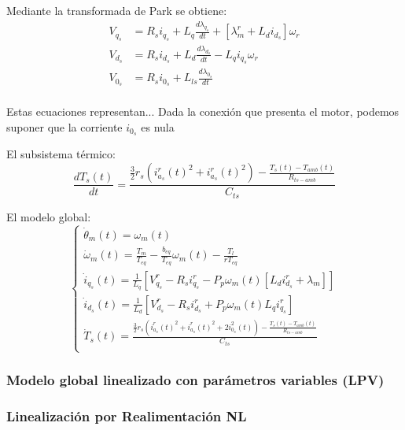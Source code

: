 \documentclass{article}
\begin{document}
Mediante la transformada de Park se obtiene:
\begin{equation}
    \begin{aligned}
        V_{q_{s}} &= R_{s}i_{q_{s}} + L_{q}\frac{d\lambda_{q_{s}}}{dt} + [\lambda_{m}^r + L_{d}i_{d_{s}}]\omega_{r}\\
        V_{d_{s}} &= R_{s}i_{d_{s}} + L_{d}\frac{d\lambda_{d_{s}}}{dt} - L_{q}i_{q_{s}}\omega_{r}\\
        V_{0_{s}} &= R_{s}i_{0_{s}} + L_{ls}\frac{d\lambda_{0_{s}}}{dt}\\
    \end{aligned}
\end{equation}

Estas ecuaciones representan...
Dada la conexión que presenta el motor, podemos suponer que la corriente $i_{0_{s}}$ es nula

El subsistema térmico:
\begin{equation}
    \frac{dT_{s}(t)}{dt} = \frac{\frac{3}{2}r_{s}({i_{a_{s}}^r(t)}^2+{i_{a_{s}}^r(t)}^2)-\frac{T_{s}(t)-T_{amb}(t)}{R_{ts-amb}}}{C_{ts}}
\end{equation}

El modelo global:
\begin{equation}
    \begin{cases}
        \dot{\theta}_{m}(t) = \omega_{m}(t)\\
        \dot{\omega}_{m}(t) = \frac{T_{m}}{T_{eq}} - \frac{b_{eq}}{T_{eq}}\omega_{m}(t) - \frac{T_{l}}{rT_{eq}}\\
        \dot{i}_{q_{s}}(t) = \frac{1}{L_{q}}[V_{q_{s}}^r - R_{s}i_{q_{s}}^r - P_{p}\omega_{m}(t)[L_{d}i_{d_{s}}^r+\lambda_{m}]]  \\
        \dot{i}_{d_{s}}(t) = \frac{1}{L_{d}}[V_{d_{s}}^r - R_{s}i_{d_{s}}^r + P_{p}\omega_{m}(t)L_{q}i_{q_{s}}^r]  \\
        \dot{T}_{s}(t) = \frac{\frac{3}{2}r_{s}({i_{a_{s}}^r(t)}^2+{i_{a_{s}}^r(t)}^2+2i_{0_{s}}^2(t))-\frac{T_{s}(t)-T_{amb}(t)}{R_{ts-amb}}}{C_{ts}}\\
    \end{cases}
\end{equation}

\subsubsection*{Modelo global linealizado con parámetros variables (LPV)}


\subsubsection*{Linealización por Realimentación NL}
\end{document}
